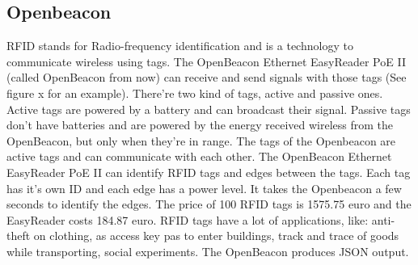 	\subsection{Openbeacon}
			RFID stands for Radio-frequency identification and is a technology to communicate wireless using tags. The OpenBeacon Ethernet EasyReader PoE II (called OpenBeacon from now) can receive and send signals with those tags (See figure x for an example). There're two kind of tags, active and passive ones. Active tags are powered by a battery and can broadcast their signal. Passive tags don't have batteries and are powered by the energy received wireless from the OpenBeacon, but only when they're in range. The tags of the Openbeacon are active tags and can communicate with each other. The OpenBeacon Ethernet EasyReader PoE II can identify RFID tags and edges between the tags. Each tag has it's own ID and each edge has a power level. It takes the Openbeacon a few seconds to identify the edges. The price of 100 RFID tags is 1575.75 euro and the EasyReader costs 184.87 euro. RFID tags have a lot of applications, like: anti-theft on clothing, as access key pas to enter buildings, track and trace of goods while transporting, social experiments\cite{2008arXiv0811.4170B}. The OpenBeacon produces JSON output.

